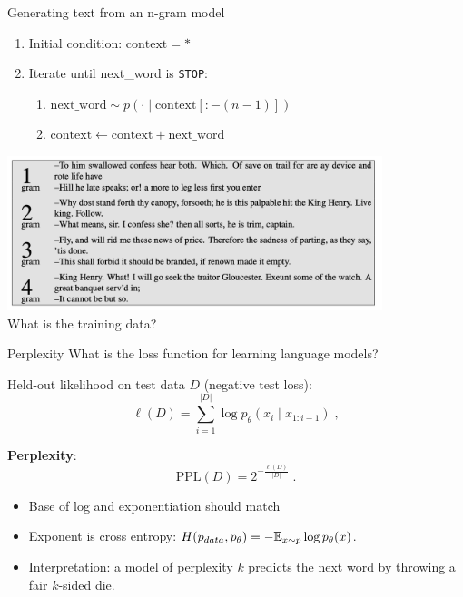 \documentclass[usenames,dvipsnames,notes,11pt,aspectratio=169,hyperref={colorlinks=true, linkcolor=blue}]{beamer}
\newcommand{\pdfnote}[1]{}
\begin{document}
\begin{frame}
    {Generating text from an n-gram model}
    \begin{enumerate}
        \item Initial condition: $\text{context}=\ast$
        \item Iterate until next\_word is \texttt{STOP}:
            \begin{enumerate}
                \item $\text{next\_word} \sim p(\cdot \mid \text{context}[:-(n-1)])$
                \item $\text{context}  \leftarrow \text{context} + \text{next\_word}$
            \end{enumerate}
    \end{enumerate}

    \pause
    \includegraphics[height=4.5cm]{figures/ngram-sample}\\[1ex]
    What is the training data?

\end{frame}

\begin{frame}
    {Perplexity}
    What is the loss function for learning language models?
    \pause

    Held-out likelihood on test data $D$ (negative test loss):
    $$
    \ell({D}) = \sum_{i=1}^{|D|} \log p_\theta(x_i\mid x_{1:i-1}) \;,
    $$
    \vspace{-2em}
    \pdfnote{In practice, no sentence segmentation, a sequence of words, average likelihood of each word}
    \pause

    \textbf{Perplexity}:
    $$
 \text{PPL}(D) = 2^{-\frac{\ell(D)}{|D|}} \;.
 $$
    \vspace{-2em}
    \begin{itemize}
        \item Base of log and exponentiation should match
        \item Exponent is cross entropy: $H(p_{data}, p_\theta) = -\mathbb{E}_{x\sim p}\log p_\theta(x)$.
            \pdfnote{Entropy is the number of bits needed to encode an event from a certain distribution.}
            \pdfnote{Cross-entropy is the number of bits needed to encode an event from a certain distribution (here p data) when your coding scheme is optimized for another distribution (here p theta).}
        \item Interpretation: a model of perplexity $k$ predicts the next word by throwing a fair $k$-sided die.
            \pdfnote{2 to the number of bits: total number of outcomes}
            \pdfnote{Sanity check: if PPL is larger than vocab size, something must be wrong.}
    \end{itemize}
\end{frame}
\end{document}
